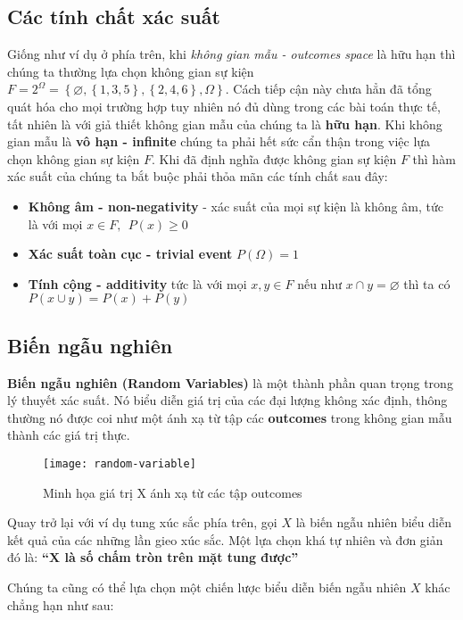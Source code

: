 \documentclass[../main-report.tex]{subfiles}
\begin{document}
\subsection{Các tính chất xác suất}
Giống như ví dụ ở phía trên, khi \textit{không gian mẫu - outcomes space} là hữu hạn thì chúng ta thường lựa chọn không gian sự kiện $F=2^{\Omega} = \left \{ \varnothing , \left \{ 1, 3, 5 \right \}, \left \{ 2, 4, 6 \right \}, \Omega \right \}$. Cách tiếp cận này chưa hẳn đã tổng quát hóa cho mọi trường hợp tuy nhiên nó đủ dùng trong các bài toán thực tế, tất nhiên là với giả thiết không gian mẫu của chúng ta là \textbf{hữu hạn}. Khi không gian mẫu là\textbf{ vô hạn - infinite} chúng ta phải hết sức cẩn thận trong việc lựa chọn không gian sự kiện $F$. Khi đã định nghĩa được không gian sự kiện $F$ thì hàm xác suất của chúng ta bắt buộc phải thỏa mãn các tính chất sau đây:

\begin{itemize}
\item \textbf{Không âm - non-negativity} - xác suất của mọi sự kiện là không âm, tức là với mọi $x \in F,~~ P(x)\geq 0$
\item \textbf{Xác suất toàn cục - trivial event} $P(\Omega) = 1$
\item \textbf{Tính cộng - additivity} tức là với mọi $x, y \in F$ nếu như $x\cap y= \varnothing$ thì ta có $P(x\cup y) = P(x) + P(y)$
\end{itemize}

\subsection{Biến ngẫu nghiên}
\textbf{Biến ngẫu nghiên (Random Variables)} là một thành phần quan trọng trong lý thuyết xác suất. Nó biểu diễn giá trị của các đại lượng không xác định, thông thường nó được coi như một ánh xạ từ tập các \textbf{outcomes} trong không gian mẫu thành các giá trị thực.

\begin{figure}[ht!]
\centering\texttt{[image: random-variable]}
\caption{Minh họa giá trị X ánh xạ từ các tập outcomes}
\end{figure}

Quay trở lại với ví dụ tung xúc sắc phía trên, gọi $X$ là biến ngẫu nhiên biểu diễn kết quả của các những lần gieo xúc sắc. Một lựa chọn khá tự nhiên và đơn giản đó là: \textbf{``$\boldsymbol{X}$ là số chấm tròn trên mặt tung được''}

Chúng ta cũng có thể lựa chọn một chiến lược biểu diễn biến ngẫu nhiên $X$ khác chẳng hạn như sau:
\end{document}
